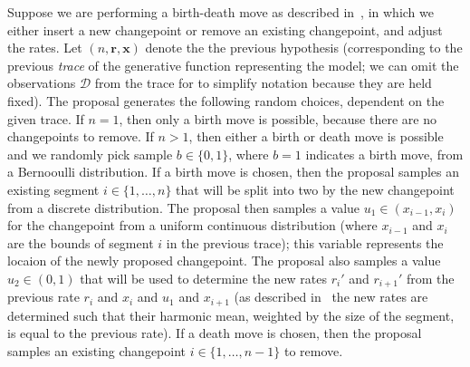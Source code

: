 \documentclass{article}
\begin{document}
Suppose we are performing a birth-death move as described in~\citep{green1995reversible}, in which we either insert a new changepoint or remove an existing changepoint, and adjust the rates.
Let $(n, \mathbf{r}, \mathbf{x})$ denote the the previous hypothesis (corresponding to the previous \emph{trace} of the generative function representing the model; we can omit the observations $\mathcal{D}$ from the trace for to simplify notation because they are held fixed).
The proposal generates the following random choices, dependent on the given trace.
If $n = 1$, then only a birth move is possible, because there are no changepoints to remove.
If $n > 1$, then either a birth or death move is possible and we randomly pick sample $b \in \{0, 1\}$, where $b = 1$ indicates a birth move, from a Bernooulli distribution.
If a birth move is chosen, then the proposal samples an existing segment $i \in \{1, \ldots, n\}$ that will be split into two by the new changepoint from a discrete distribution.
The proposal then samples a value $u_1 \in (x_{i-1}, x_i)$ for the changepoint from a uniform continuous distribution (where $x_{i-1}$ and $x_i$ are the bounds of segment $i$ in the previous trace); this variable represents the locaion of the newly proposed changepoint.
The proposal also samples a value $u_2 \in (0, 1)$ that will be used to determine the new rates $r_{i}'$ and $r_{i+1}'$ from the previous rate $r_i$ and $x_i$ and $u_1$ and $x_{i+1}$ (as described in~\citep{green1995reversible} the new rates are determined such that their harmonic mean, weighted by the size of the segment, is equal to the previous rate).
If a death move is chosen, then the proposal samples an existing changepoint $i \in \{1, \ldots, n-1\}$ to remove.
\end{document}
